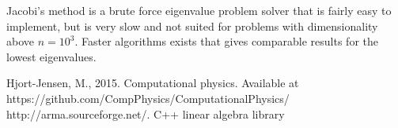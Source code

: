 \documentclass{article}
\begin{document}
Jacobi's method is a brute force eigenvalue problem solver that is fairly easy to implement, but is very slow and not suited for problems with dimensionality above $n=10^3$. Faster algorithms exists that gives comparable results for the lowest eigenvalues. 




\clearpage

\begin{thebibliography}{1}
 Hjort-Jensen, M., 2015. Computational physics. Available at https://github.com/CompPhysics/ComputationalPhysics/
 http://arma.sourceforge.net/. C++ linear algebra library
\end{thebibliography}
\end{document}
